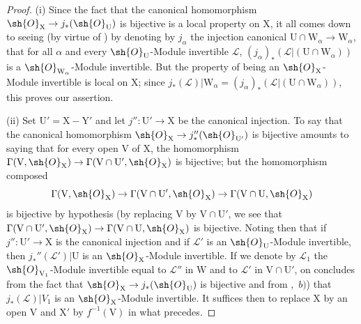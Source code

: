 \begin{proof}
(i) Since the fact that the canonical homomorphism $\sh{O}_{\mathrm{X}}\to j_*(\sh{O}_{\mathrm{U}})$ is bijective is a local property on $\mathrm{X}$, it all comes down to seeing (by virtue of ) by denoting by $j_\alpha$ the injection canonical $\mathrm{U}\cap\mathrm{W}_\alpha\to\mathrm{W}_\alpha$, that for all $\alpha$ and every $\sh{O}_{\mathrm{U}}$-Module invertible $\mathscr{L}$, $(j_\alpha)_*(\mathscr{L}|(\mathrm{U}\cap\mathrm{W}_\alpha))$ is a $\sh{O}_{\mathrm{W}_\alpha}$-Module invertible.
But the property of being an $\sh{O}_{\mathrm{X}}$-Module invertible is local on $\mathrm{X}$; since $j_*(\mathscr{L})|\mathrm{W}_\alpha=(j_\alpha)_*(\mathscr{L}|(\mathrm{U}\cap\mathrm{W}_\alpha))$, this proves our assertion.

(ii) Set $\mathrm{U}'=\mathrm{X}-\mathrm{Y}'$ and let $j'':\mathrm{U}'\to\mathrm{X}$ be the canonical injection.
To say that the canonical homomorphism $\sh{O}_{\mathrm{X}}\to j''_*(\sh{O}_{\mathrm{U}'})$ is bijective amounts to saying that for every open $\mathrm{V}$ of $\mathrm{X}$, the homomorphism $\Gamma(\mathrm{V},\sh{O}_{\mathrm{X}})\to\Gamma(\mathrm{V}\cap\mathrm{U}',\sh{O}_{\mathrm{X}})$ is bijective; but the homomorphism composed
\[
  \Gamma(\mathrm{V},\sh{O}_{\mathrm{X}})\to\Gamma(\mathrm{V}\cap\mathrm{U}',\sh{O}_{\mathrm{X}})\to\Gamma(\mathrm{V}\cap\mathrm{U},\sh{O}_{\mathrm{X}})
\]
is bijective by hypothesis (by replacing $\mathrm{V}$ by $\mathrm{V}\cap\mathrm{U}'$, we see that $\Gamma(\mathrm{V}\cap\mathrm{U}',\sh{O}_{\mathrm{X}})\to\Gamma(\mathrm{V}\cap\mathrm{U},\sh{O}_{\mathrm{X}})$ is bijective.
Noting then that if $j'':\mathrm{U}'\to\mathrm{X}$ is the canonical injection and if $\mathscr{L}'$ is an $\sh{O}_{\mathrm{U}}$-Module invertible, then $j_*''(\mathscr{L}')|\mathrm{U}$ is an $\sh{O}_{\mathrm{X}}$-Module invertible.
If we denote by $\mathscr{L}_1$ the $\sh{O}_{\mathrm{V}_1}$-Module invertible equal to $\mathscr{L}''$ in $\mathrm{W}$ and to $\mathscr{L}'$ in $\mathrm{V}\cap\mathrm{U}'$, on concludes from the fact that $\sh{O}_{\mathrm{X}}\to j_*(\sh{O}_{\mathrm{U}})$ is bijective and from ,~$b)$) that $j_*(\mathscr{L})|V_1$ is an $\sh{O}_{\mathrm{X}}$-Module invertible.
It suffices then to replace $\mathrm{X}$ by an open $\mathrm{V}$ and $\mathrm{X}'$ by $f^{-1}(\mathrm{V})$ in what precedes.


\end{proof}
